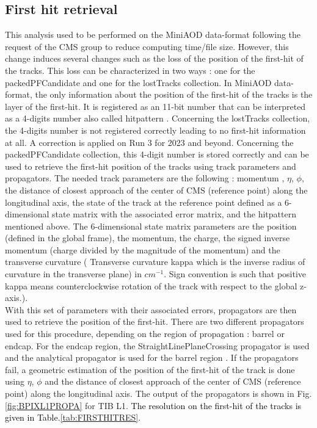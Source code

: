 \documentclass{cernatlasnote}
\begin{document}
\subsection{First hit retrieval}
\label{APP: FIRSTHIT}
This analysis used to be performed on the  MiniAOD data-format following the request of the CMS group to reduce computing time/file size. However, this change induces several changes such as the loss of the position of the first-hit of the tracks. This loss can be characterized in two ways : one for the packedPFCandidate and one for the lostTracks collection. In MiniAOD data-format, the only information about the position of the first-hit of the tracks is the layer of the first-hit. It is registered as an 11-bit number that can be interpreted as a 4-digits number also called hitpattern \cite{HP}. Concerning the lostTracks collection, the 4-digits number is not registered correctly leading to no first-hit information at all. A correction is applied on Run 3 for 2023 and beyond. Concerning the packedPFCandidate collection, this 4-digit number is stored correctly and can be used to retrieve the first-hit position of the tracks using track parameters and propagators. The needed track parameters are the following : momentum , $\eta$, $\phi$, the distance of closest approach of the center of CMS (reference point) along the longitudinal axis, the state of the track at the reference point defined as a 6-dimensional state matrix with the associated error matrix, and the hitpattern mentioned above. The 6-dimensional state matrix parameters are the position (defined in the global frame), the momentum, the charge, the signed inverse momentum (charge divided by the magnitude of the momentum) and the transverse curvature ( Transverse curvature kappa which is the inverse radius of curvature in the transverse plane) in $cm^{-1}$. Sign convention is such that positive kappa means counterclockwise rotation of the track with respect to the global z-axis.). \\

With this set of parameters with their associated errors, propagators are then used to retrieve the position of the first-hit. There are two different propagators used for this procedure, depending on the region of propagation : barrel or endcap. For the endcap region, the StraightLinePlaneCrossing propagator is used and the analytical propagator is used for the barrel region \cite{PROP}. If the propagators fail, a geometric estimation of the position of the first-hit of the track is done using $\eta$, $\phi$ and the distance of closest approach of the center of CMS (reference point) along the longitudinal axis. The output of the propagators is shown in Fig.\ref{fig:BPIXL1PROPA} for TIB L1. \textcolor{black}{The resolution on the first-hit of the tracks is given in Table.\ref{tab:FIRSTHITRES}}.
\end{document}
